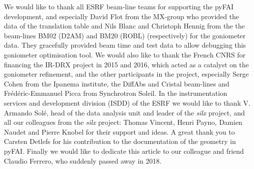 \documentclass[preprint]{iucr}              %
\begin{document}
We would like to thank all ESRF beam-line teams for supporting the
pyFAI development, and especially David Flot from the MX-group who provided the
data of the translation table and Nils Blanc and Christoph Hennig from the the
beam-lines BM02 (D2AM) and BM20 (ROBL) (respectively) for the goniometer data. 
They gracefully provided beam time and test data to allow debugging this 
goniometer optimisation tool.
We would also like to thank the French CNRS for financing the IR-DRX project
in 2015 and 2016, which acted as a catalyst on the goniometer refinement,
and the other participants in the project, especially Serge Cohen from the
Ipanema institute, the DiffAbs and Cristal beam-lines and Frédéric-Emmanuel Picca 
from Synchrotron Soleil.
In the instrumentation services and development division (ISDD) of the ESRF  we
would like to thank V. Armando Solé, head of the data analysis unit and leader of 
the \textit{silx} project, and all our colleagues from the \textit{silx}
project:
Thomas Vincent, Henri Payno, Damien Naudet and  Pierre Knobel for their support and ideas. 
A great thank you to Carsten Detlefs for his contribution to the documentation of the geometry in pyFAI. 
Finally we would like to dedicate this article to our colleague and friend Claudio Ferrero, who suddenly passed away in 2018. 



\end{document}
